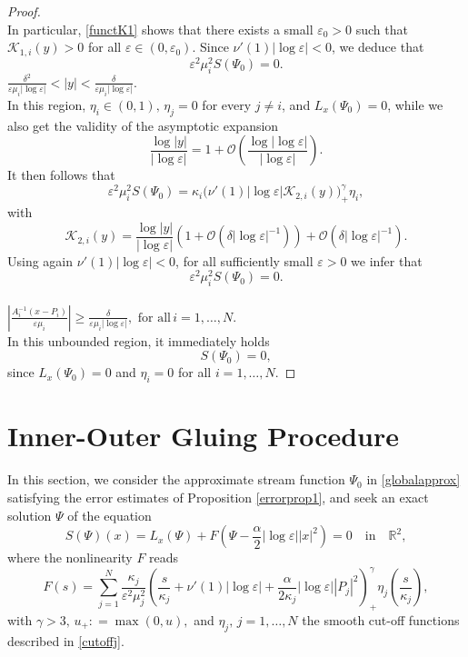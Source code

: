\documentclass[11pt,reqno,a4paper]{amsart}
\numberwithin{equation}{section}
\newcommand{\R}{\mathbb{R}}
\newcommand{\defeq}{\mathrel{\mathop:}=}
\newcommand{\ve}{\varepsilon}
\begin{document}
\begin{proof}
\begin{equation}
\end{equation}
In particular, \eqref{functK1} shows that there exists a small $\ve_0>0$ such that $\mathcal{K}_{1,i}(y)>0$ for all $\ve \in (0,\ve_0)$. Since $\nu'(1)|\log\ve|<0$, we deduce that  
\[\ve^2\mu_i^2S(\Psi_0)=0.\]
 $\frac{\delta^2}{\ve\mu_i|\log\ve|} < |y| < \frac{\delta}{\ve\mu_i|\log\ve|}.$
\\
In this region, $\eta_{i}\in(0,1),\,\eta_j=0$ for every $j\neq i$, and $L_x(\Psi_0)=0$, while we also get the validity of the asymptotic expansion
\[\frac{\log|y|}{|\log\ve|}=1+\mathcal{O}\left(\frac{\log|\log\ve|}{|\log\ve|}\right).\]
It then follows that
\[\ve^2\mu_i^2S(\Psi_0)=\kappa_i\Big(\nu'(1)|\log\ve|\mathcal{K}_{2,i}(y)\Big)^{\gamma}_{+}\eta_i,\]
with   \[\mathcal{K}_{2,i}(y)=\frac{\log|y|}{|\log\ve|}\left(1+\mathcal{O}(\delta|\log\ve|^{-1})\right)+\mathcal{O}\left(\delta|\log\ve|^{-1}\right).\]
Using again $\nu'(1)|\log\ve|<0$, for all sufficiently small $\ve>0$ we infer that 
\[\ve^2\mu_i^2S(\Psi_0)=0.\]
\\
 $\left|\frac{A_i^{-1}(x-P_i)}{\ve\mu_i}\right| \geq \frac{\delta}{\ve\mu_i|\log\ve|}, \,\, \mbox{for all} \,i=1,\dots,N.$
\\
In this unbounded region, it immediately holds 
\begin{equation*}
S(\Psi_0)=0,
\end{equation*}
since $L_{x}(\Psi_0)=0$ and $\eta_i=0$ for all $i=1,\dots,N.$
\end{proof}

\section{Inner-Outer Gluing Procedure}\label{Section 6}
In this section, we consider the approximate stream function $\Psi_{0}$ in \eqref{globalapprox} satisfying the error estimates of Proposition \ref{errorprop1}, and seek an exact solution $\Psi$ of the equation 
\begin{equation}\label{truesol}
  S\left(\Psi\right)(x)=L_{x}\left(\Psi\right)+F\left(\Psi-\frac{\alpha}{2}|\log\ve||x|^2\right)=0 \quad \text{in} \quad \R^2, 
\end{equation}
where the nonlinearity $F$ reads
\[F(s)=\sum_{j=1}^{N}\frac{\kappa_j}{\ve^2\mu_j^2}\left(\frac{s}{\kappa_j} +\nu'(1)|\log\ve|+\frac{\alpha}{2\kappa_j}|\log\ve||P_j|^2\right)^{\gamma}_{+}\eta_{j}\left(\frac{s}{\kappa_j}\right),\]
with $\gamma>3,\,u_+\defeq\max(0,u),$ and $\eta_{j},\,j=1,\dots,N$ the smooth cut-off functions described in \eqref{cutoffj}. 
\end{document}
